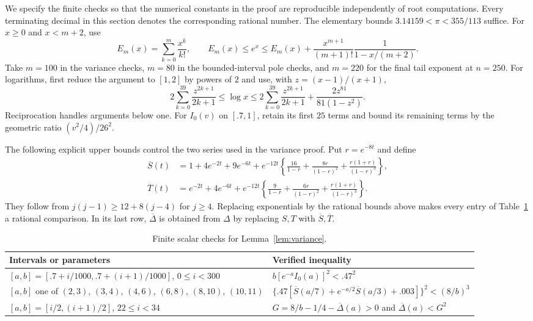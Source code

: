 We specify the finite checks so that the numerical constants in the
proof are reproducible independently of root computations. Every
terminating decimal in this section denotes the corresponding rational
number. The elementary bounds $3.14159<\pi<355/113$ suffice.
For $x\ge0$ and $x<m+2$, use
\[
 E_m(x)=\sum_{k=0}^m\frac{x^k}{k!},\qquad
 E_m(x)\le e^x\le
 E_m(x)+\frac{x^{m+1}}{(m+1)!}\frac1{1-x/(m+2)}.
\]
Take $m=100$ in the variance checks, $m=80$ in the bounded-interval
pole checks, and $m=220$ for the final tail exponent at $n=250$.
For logarithms, first reduce the argument to $[1,2]$ by powers of
$2$ and use, with $z=(x-1)/(x+1)$,
\[
 2\sum_{k=0}^{39}\frac{z^{2k+1}}{2k+1}
 \le\log x\le
 2\sum_{k=0}^{39}\frac{z^{2k+1}}{2k+1}
 +\frac{2z^{81}}{81(1-z^2)}.
\]
Reciprocation handles arguments below one.
For $I_0(v)$ on $[.7,1]$, retain its first $25$ terms and bound its
remaining terms by the geometric ratio $(v^2/4)/26^2$.

The following explicit upper bounds control the two series used in
the variance proof. Put $r=e^{-8t}$ and define
\begin{align*}
 \overline S(t)&=1+4e^{-2t}+9e^{-6t}
 +e^{-12t}\left\{\frac{16}{1-r}
 +\frac{8r}{(1-r)^2}+\frac{r(1+r)}{(1-r)^3}\right\},\\
 \overline T(t)&=e^{-2t}+4e^{-6t}
 +e^{-12t}\left\{\frac9{1-r}
 +\frac{6r}{(1-r)^2}+\frac{r(1+r)}{(1-r)^3}\right\}.
\end{align*}
They follow from $j(j-1)\ge12+8(j-4)$ for $j\ge4$.
Replacing exponentials by the rational bounds above makes every entry
of Table~\ref{tab:variance-intervals} a rational comparison. In its last
row, $\overline\Delta$ is obtained from $\Delta$ by replacing $S,T$
with $\overline S,\overline T$.

\begin{table}[ht]
\centering
\caption{Finite scalar checks for Lemma~\ref{lem:variance}.}
\label{tab:variance-intervals}
\begin{tabular}{p{}p{}}
\toprule
Intervals or parameters & Verified inequality\\
\midrule
$[a,b]=[.7+i/1000,.7+(i+1)/1000]$, $0\le i<300$
& $b[e^{-a}I_0(a)]^2<.47^2$\\[3pt]
$[a,b]$ one of $(2,3)$, $(3,4)$, $(4,6)$, $(6,8)$, $(8,10)$, $(10,11)$
& $\{.47[\overline S(a/7)+e^{-a/2}\overline S(a/3)+.003]\}^2<(8/b)^3$\\[3pt]
$[a,b]=[i/2,(i+1)/2]$, $22\le i<34$
& $G=8/b-1/4-\overline\Delta(a)>0$ and $\overline\Delta(a)<G^2$\\
\bottomrule
\end{tabular}
\end{table}

